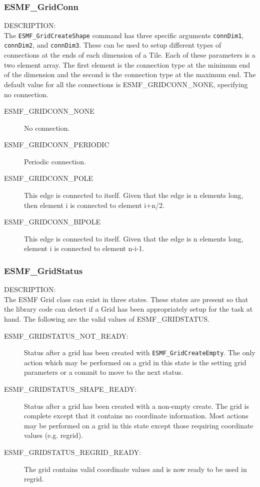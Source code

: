 
\subsubsection{ESMF\_GridConn}
\label{sec:opt:gridconn}
{\sf DESCRIPTION:\\}
The {\tt ESMF\_GridCreateShape} command has three specific arguments
{\tt connDim1}, {\tt connDim2}, and {\tt connDim3}. These can be used
to setup different types of connections at the ends of each dimension
of a Tile.  Each of these parameters is a two element array. The first
element is the connection type at the minimum end of the dimension
and the second is the connection type at the maximum end. The default
value for all the connections is ESMF\_GRIDCONN\_NONE, specifying no
connection.

\medskip
\begin{description}
\item [ESMF\_GRIDCONN\_NONE] No connection.

\item [ESMF\_GRIDCONN\_PERIODIC] Periodic connection.

\item [ESMF\_GRIDCONN\_POLE] This edge is connected to itself. Given
that the edge is n elements long, then element i is connected to
element i+n/2.

\item [ESMF\_GRIDCONN\_BIPOLE] This edge is connected to itself. Given
that the edge is n elements long, element i is connected to element n-i-1.

\end{description}

\subsubsection{ESMF\_GridStatus}\label{sec:opt:gridstatus}

 {\sf DESCRIPTION:\\}
The ESMF Grid class can exist in three states. These states are
present so that the library code can detect if a Grid has been
appropriately setup for the task at hand. The following
are the valid values of ESMF\_GRIDSTATUS.

\medskip
\begin{description}
\item [ESMF\_GRIDSTATUS\_NOT\_READY:] Status after a grid has been created with 
      {\tt ESMF\_GridCreateEmpty}. The only action which may be performed on a
      grid in this state is the setting grid parameters or a commit to move 
      to the next status. 
\item [ESMF\_GRIDSTATUS\_SHAPE\_READY:] Status after a grid has been created with 
      a non-empty create. The grid is complete except that it contains no coordinate
      information. Most actions may be performed on a grid in this state
      except those requiring coordinate values (e.g. regrid).
\item [ESMF\_GRIDSTATUS\_REGRID\_READY:] The grid contains valid coordinate
      values and is now ready to be used in regrid. 
\end{description}


